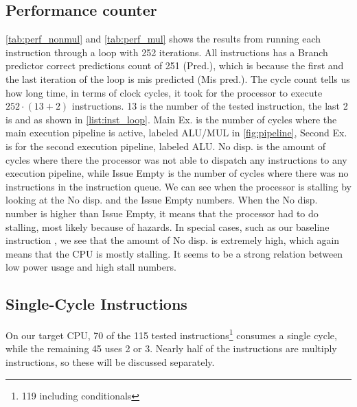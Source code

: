 \subsection{Performance counter}
\autoref{tab:perf_nonmul} and \autoref{tab:perf_mul} shows the results from
running each instruction through a loop with 252 iterations. All instructions
has a Branch predictor correct predictions count of 251 (Pred.), which is
because the first and the last iteration of the loop is mis predicted (Mis
pred.). The cycle count tells us how long time, in terms of clock cycles, it
took for the processor to execute $252 \cdot (13+2)$ instructions. 13 is the
number of the tested instruction, the last 2 is  and  as
shown in \autoref{list:inst_loop}. Main Ex. is the number of cycles where the
main execution pipeline is active, labeled ALU/MUL in \autoref{fig:pipeline},
Second Ex. is for the second execution pipeline, labeled ALU. No disp. is the
amount of cycles where there the processor was not able to dispatch any
instructions to any execution pipeline, while Issue Empty is the number of
cycles where there was no instructions in the instruction queue. We can see when
the processor is stalling by looking at the No disp. and the Issue Empty
numbers. When the No disp. number is higher than Issue Empty, it means that the
processor had to do stalling, most likely because of hazards. In special cases,
such as our baseline instruction , we see that the amount of No
disp. is extremely high, which again means that the CPU is mostly stalling. It
seems to be a strong relation between low power usage and high stall numbers.



\subsection{Single-Cycle Instructions}
On our target CPU, 70 of the 115 tested instructions\footnote{119 including
conditionals} consumes a single cycle, while the remaining 45 uses 2 or 3.
Nearly half of the instructions are multiply instructions, so these will be
discussed separately.

